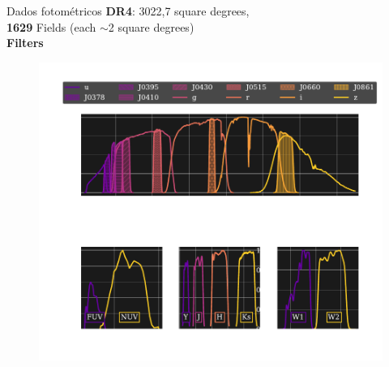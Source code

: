 \begin{frame}[c]{Dados fotométricos}%
    \textbf{DR4}: 3022,7 square degrees,\\
    \textbf{1629} Fields (each $\sim$2 square degrees)\\
    \textbf{Filters}
    \begin{figure}
        \centering
        \includegraphics[width=\linewidth]{script/images/transmission_curves.pdf}
    \end{figure}
\end{frame}

